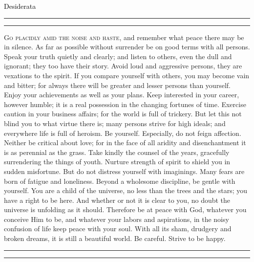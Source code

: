 \documentclass[14pt]{article}
\newcommand{\attrib}[1]{\nopagebreak{\raggedleft\footnotesize #1\par}}
\begin{document}
\begin{center}\textcolor{Black}{ %
{\Huge Desiderata}\\[0.5\baselineskip]}\end{center} %

\rule{13cm}{1pt}\par %
\vspace{2pt}\vspace{-\baselineskip} %
\rule{13cm}{0.4pt}\par %
\Large
\lettrine[lines=3,findent=5pt,nindent=-1pt]{G}{o placidly amid the noise and haste}, and remember what peace there may be in silence.  As far as possible without surrender be on good terms with all persons.  Speak your truth quietly and clearly; and listen to others, even the dull and ignorant; they too have their story. 
Avoid loud and aggressive persons, they are vexations to the spirit.  If you compare yourself with others, you may become vain and bitter; for always there will be greater and lesser persons than yourself.  Enjoy your achievements as well as your plans.  Keep interested in your career, however humble; it is a real possession in the changing fortunes of time.  Exercise caution in your business affairs; for the world is full of trickery.  But let this not blind you to what virtue there is; many persons strive for high ideals; and everywhere life is full of heroism.  Be yourself.  Especially, do not feign affection.  Neither be critical about love; for in the face of all aridity and disenchantment it is as perennial as the grass.  Take kindly the counsel of the years, gracefully surrendering the things of youth.  Nurture strength of spirit to shield you in sudden misfortune.  But do not distress yourself with imaginings.  Many fears are born of fatigue and loneliness.  Beyond a wholesome discipline, be gentle with yourself.  You are a child of the universe, no less than the trees and the stars; you have a right to be here.  And whether or not it is clear to you, no doubt the universe is unfolding as it should.  Therefore be at peace with God, whatever you conceive Him to be,
 and whatever your labors and aspirations, in the noisy confusion of life keep peace with your soul.  With all its sham, drudgery and broken dreams, it is still a beautiful world.  Be careful.  Strive to be happy. \hfill

\rule{13cm}{0.4pt}\par %
\vspace{2pt}\vspace{-\baselineskip} %
\rule{13cm}{1pt}\par %
 
\attrib{Max Ehrmann 1927}
\vspace{5cm}
\end{document}
